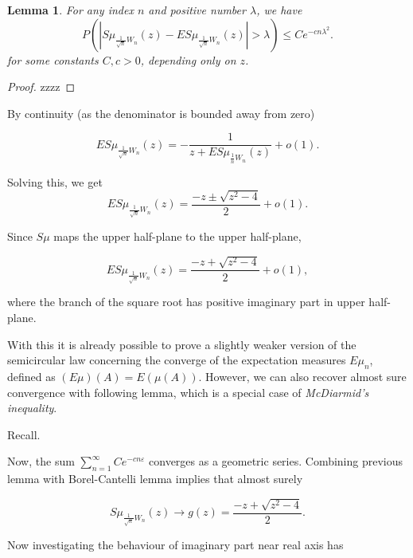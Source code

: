 \documentclass[12pt,a4paper,leqno]{report}
\theoremstyle{plain}
\newtheorem{lem}[equation]{Lemma}
\theoremstyle{definition}
\theoremstyle{remark}
\begin{document}
\begin{lem}
For any index $n$ and positive number $\lambda$, we have
\begin{equation*}
P(|S\mu_{\frac{1}{\sqrt{n}}W_n}(z)- ES\mu_{\frac{1}{\sqrt{n}}W_n}(z)|>\lambda) \leq Ce^{-cn\lambda^2}.
\end{equation*}
for some constants $C, c > 0$, depending only on $z$.
\end{lem}

\begin{proof}
zzzz
\end{proof}

By continuity (as the denominator is bounded away from zero) 

\begin{equation*}
ES\mu_{\frac{1}{\sqrt{n}}W_n}(z) = -\frac{1}{z+ES\mu_{\frac{1}{n}W_n}(z)} + o(1).
\end{equation*}

Solving this, we get
\begin{equation*}
ES\mu_{\frac{1}{\sqrt{n}}W_n}(z) = \frac{-z \pm \sqrt{z^2 - 4}}{2} +o(1).
\end{equation*}

Since $S\mu$ maps the upper half-plane to the upper half-plane,  

\begin{equation*}
ES\mu_{\frac{1}{\sqrt{n}}W_n}(z) = \frac{-z + \sqrt{z^2 - 4}}{2} +o(1),
\end{equation*}

where the branch of the square root has positive imaginary part in upper half-plane.

With this it is already possible to prove a slightly weaker version of the semicircular law concerning the converge of the expectation measures $E\mu_n$, defined as $(E\mu)(A) = E(\mu(A))$. However, we can also recover almost sure convergence with following lemma, which is a special case of \emph{McDiarmid's inequality}.

Recall.

Now, the sum $\sum_{n=1}^{\infty} Ce^{-cn\varepsilon}$ converges as a geometric series. Combining previous lemma with Borel-Cantelli lemma implies that almost surely

\begin{equation*}
S\mu_{\frac{1}{\sqrt{n}}W_n}(z) \to g(z) = \frac{-z + \sqrt{z^2-4}}{2}.
\end{equation*}

Now investigating the behaviour of imaginary part near real axis has
\end{document}
